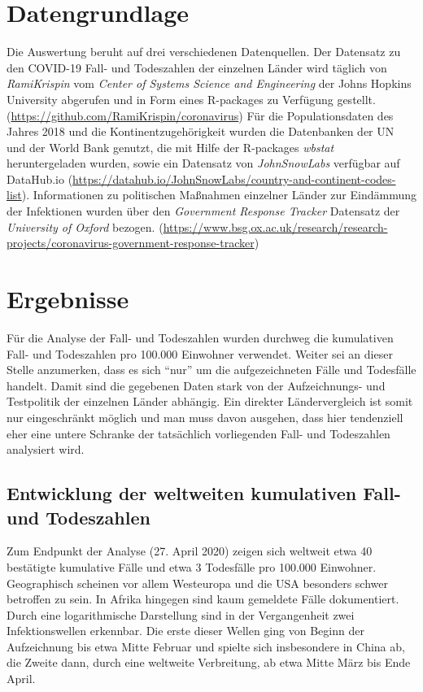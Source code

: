 \documentclass[12pt, a4paper]{article}
\begin{document}
\section{Datengrundlage}
Die Auswertung beruht auf drei verschiedenen Datenquellen. Der Datensatz zu den COVID-19 Fall- und Todeszahlen der einzelnen Länder wird täglich von \emph{RamiKrispin} vom \emph{Center of Systems Science and Engineering} der Johns Hopkins University abgerufen und in Form eines R-packages zu Verfügung gestellt. (\url{https://github.com/RamiKrispin/coronavirus}) Für die Populationsdaten des Jahres 2018 und die Kontinentzugehörigkeit wurden die Datenbanken der UN und der World Bank genutzt, die mit Hilfe der R-packages \emph{wbstat} heruntergeladen wurden, sowie ein Datensatz von \emph{JohnSnowLabs} verfügbar auf DataHub.io (\url{https://datahub.io/JohnSnowLabs/country-and-continent-codes-list}).
Informationen zu politischen Maßnahmen einzelner Länder zur Eindämmung der Infektionen wurden über den \emph{Government Response Tracker} Datensatz der \emph{University of Oxford} bezogen. (\url{https://www.bsg.ox.ac.uk/research/research-projects/coronavirus-government-response-tracker})

\section{Ergebnisse}
Für die Analyse der Fall- und Todeszahlen wurden durchweg die kumulativen Fall- und Todeszahlen pro 100.000 Einwohner verwendet. Weiter sei an dieser Stelle anzumerken, dass es sich ``nur'' um die aufgezeichneten Fälle und Todesfälle handelt. Damit sind die gegebenen Daten stark von der Aufzeichnungs- und Testpolitik der einzelnen Länder abhängig. Ein direkter Ländervergleich ist somit nur eingeschränkt möglich und man muss davon ausgehen, dass hier tendenziell eher eine untere Schranke der tatsächlich vorliegenden Fall- und Todeszahlen analysiert wird. 
\subsection{Entwicklung der weltweiten kumulativen Fall- und Todeszahlen}
Zum Endpunkt der Analyse (27. April 2020) zeigen sich weltweit etwa 40 bestätigte kumulative Fälle und etwa 3 Todesfälle pro 100.000 Einwohner. Geographisch scheinen vor allem Westeuropa und die USA besonders schwer betroffen zu sein. In Afrika hingegen sind kaum gemeldete Fälle dokumentiert. Durch eine logarithmische Darstellung sind in der Vergangenheit zwei Infektionswellen erkennbar. Die erste dieser Wellen ging von Beginn der Aufzeichnung bis etwa Mitte Februar und spielte sich insbesondere in China ab, die Zweite dann, durch eine weltweite Verbreitung, ab etwa Mitte März bis Ende April.
\end{document}

